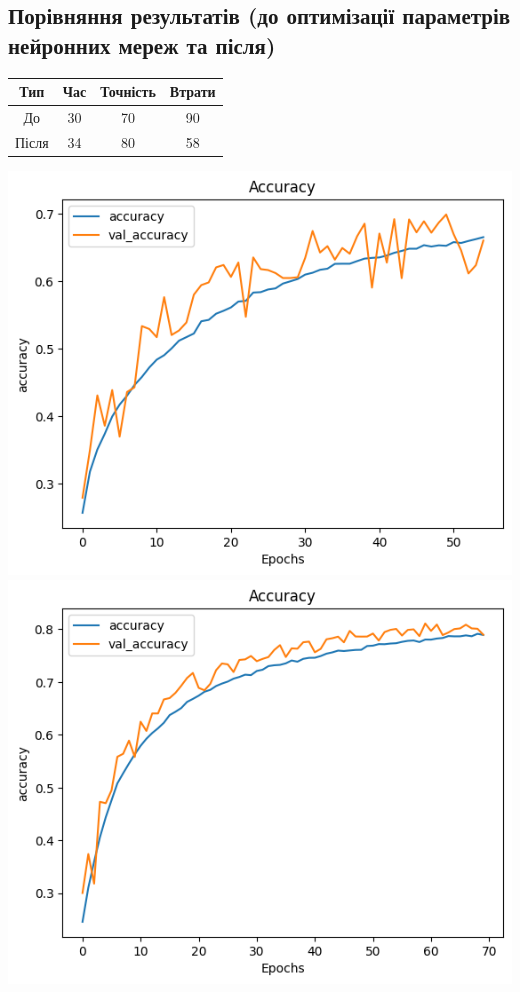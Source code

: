 \documentclass{article}
\begin{document}
        \subsection{Порівняння результатів (до оптимізації параметрів нейронних мереж та після)}
            \begin{tabular}{ |c|c|c|c| }
                \hline
                Тип & Час & Точність & Втрати\\ 
                \hline
                До & 30 & 70 & 90\\
                \hline
                Після & 34 & 80 & 58\\
                \hline
            \end{tabular}
    \newpage
            \includegraphics[scale=0.5]{before_acc.png}
            \includegraphics[scale=0.5]{after_acc.png}
\end{document}
